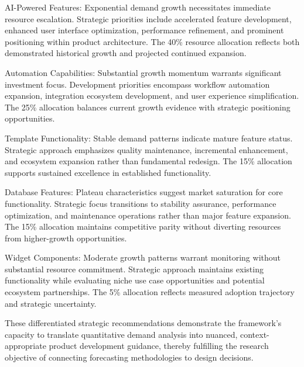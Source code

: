 AI-Powered Features: Exponential demand growth necessitates immediate resource escalation. Strategic priorities include accelerated feature development, enhanced user interface optimization, performance refinement, and prominent positioning within product architecture. The 40\% resource allocation reflects both demonstrated historical growth and projected continued expansion.

Automation Capabilities: Substantial growth momentum warrants significant investment focus. Development priorities encompass workflow automation expansion, integration ecosystem development, and user experience simplification. The 25\% allocation balances current growth evidence with strategic positioning opportunities.

Template Functionality: Stable demand patterns indicate mature feature status. Strategic approach emphasizes quality maintenance, incremental enhancement, and ecosystem expansion rather than fundamental redesign. The 15\% allocation supports sustained excellence in established functionality.

Database Features: Plateau characteristics suggest market saturation for core functionality. Strategic focus transitions to stability assurance, performance optimization, and maintenance operations rather than major feature expansion. The 15\% allocation maintains competitive parity without diverting resources from higher-growth opportunities.

Widget Components: Moderate growth patterns warrant monitoring without substantial resource commitment. Strategic approach maintains existing functionality while evaluating niche use case opportunities and potential ecosystem partnerships. The 5\% allocation reflects measured adoption trajectory and strategic uncertainty.

These differentiated strategic recommendations demonstrate the framework's capacity to translate quantitative demand analysis into nuanced, context-appropriate product development guidance, thereby fulfilling the research objective of connecting forecasting methodologies to design decisions.
